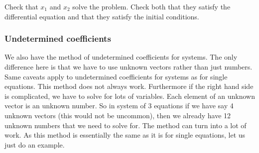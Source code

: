 \documentclass[12pt]{book}
\begin{document}
\begin{exercise}
Check that $x_1$ and $x_2$ solve the problem.  Check both that they satisfy
the differential equation and that they satisfy the initial conditions.
\end{exercise}

\subsubsection{Undetermined coefficients}

We also have
the method of
undetermined coefficients for
systems.
The only
difference here is that we have to use unknown vectors rather than just
numbers.  Same caveats apply to undetermined coefficients for systems
as for single equations.  This method does not always work.
Furthermore if the right hand side is complicated, we have to solve
for lots of
variables.  Each element of an
unknown vector is an unknown number.  So in system of 3 equations if we have
say 4 unknown vectors (this would not be uncommon), then we already have 12
unknown numbers that we need to solve for.
The method can turn into a lot of
work.  As this method is essentially the same as it is for single equations,
let us just do an example.
\end{document}
